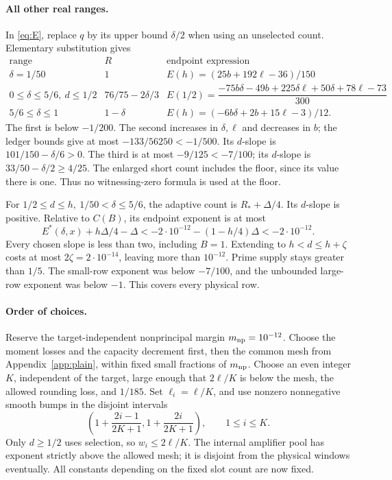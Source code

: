 \documentclass[12pt]{article}
\begin{document}
\paragraph{All other real ranges.}
In \eqref{eq:E}, replace \(q\) by its upper bound \(\delta/2\)
when using an unselected count.  Elementary substitution gives
\[
\begin{array}{c|c|c}
 \text{range}&R&\text{endpoint expression}\\ \hline
 \delta=1/50&1&
 E(h)=(25b+192\ell-36)/150\\
 0\le\delta\le5/6,\ d\le1/2&76/75-2\delta/3&
 E(1/2)=
 \dfrac{-75b\delta-49b+225\delta\ell+50\delta+78\ell-73}{300}\\
 5/6\le\delta\le1&1-\delta&
 E(h)=(-6b\delta+2b+15\ell-3)/12 .
\end{array}
\]
The first is below \(-1/200\).
The second increases in \(\delta,\ell\) and decreases in \(b\);
the ledger bounds give at most \(-133/56250<-1/500\).
Its \(d\)-slope is \(101/150-\delta/6>0\).
The third is at most \(-9/125<-7/100\);
its \(d\)-slope is \(33/50-\delta/2\ge4/25\).
The enlarged short count includes the floor, since its value
there is one.  Thus no witnessing-zero formula is used at the floor.

For \(1/2\le d\le h,\ 1/50<\delta\le5/6\), the adaptive count
is \(R_*+\Delta/4\).  Its \(d\)-slope is positive.
Relative to \(C(B)\), its endpoint exponent is at most
\[
 E^*(\delta,x)+h\Delta/4-\Delta
 <-2\cdot10^{-12}-(1-h/4)\Delta
 <-2\cdot10^{-12}.
\]
Every chosen slope is less than two, including \(B=1\).
Extending to \(h<d\le h+\zeta\) costs at most
\(2\zeta=2\cdot10^{-14}\), leaving more than \(10^{-12}\).
Prime supply stays greater than \(1/5\).
The small-row exponent was below \(-7/100\), and the unbounded
large-row exponent was below \(-1\).
This covers every physical row.

\paragraph{Order of choices.}
Reserve the target-independent nonprincipal margin
\(m_{\rm np}=10^{-12}\).
Choose the moment losses and the capacity decrement first, then
the common mesh from Appendix~\ref{app:plain}, within fixed small
fractions of \(m_{\rm np}\).
Choose an even integer \(K\), independent of the target, large
enough that \(2\ell/K\) is below the mesh, the allowed rounding
loss, and \(1/185\).
Set \(\ell_i=\ell/K\), and use nonzero nonnegative smooth
bumps in the disjoint intervals
\[
 \left(1+\frac{2i-1}{2K+1},
             1+\frac{2i}{2K+1}\right),\qquad1\le i\le K.
\]
Only \(d\ge1/2\) uses selection, so \(w_i\le2\ell/K\).
The internal amplifier pool has exponent strictly above the
allowed mesh; it is disjoint from the physical windows eventually.
All constants depending on the fixed slot count are now fixed.
\end{document}
